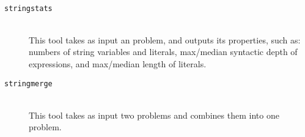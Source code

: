 \begin{description}
            \hfill \\

        \item[\texttt{stringstats}] \hfill \\
            This tool takes as input an \smt{} problem, and outputs its properties, such as: numbers of string variables and literals, max/median syntactic depth of expressions, and max/median length of literals.

            \hfill

        \item[\texttt{stringmerge}] \hfill \\
            This tool takes as input two \smt{} problems and combines them into one problem.


    \end{description}
